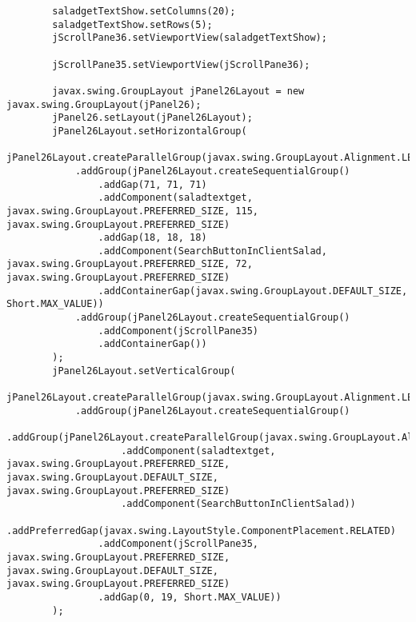 \documentclass[12pt,a4paper]{article}
\begin{document}
\begin{lstlisting}
        saladgetTextShow.setColumns(20);
        saladgetTextShow.setRows(5);
        jScrollPane36.setViewportView(saladgetTextShow);

        jScrollPane35.setViewportView(jScrollPane36);

        javax.swing.GroupLayout jPanel26Layout = new javax.swing.GroupLayout(jPanel26);
        jPanel26.setLayout(jPanel26Layout);
        jPanel26Layout.setHorizontalGroup(
            jPanel26Layout.createParallelGroup(javax.swing.GroupLayout.Alignment.LEADING)
            .addGroup(jPanel26Layout.createSequentialGroup()
                .addGap(71, 71, 71)
                .addComponent(saladtextget, javax.swing.GroupLayout.PREFERRED_SIZE, 115, javax.swing.GroupLayout.PREFERRED_SIZE)
                .addGap(18, 18, 18)
                .addComponent(SearchButtonInClientSalad, javax.swing.GroupLayout.PREFERRED_SIZE, 72, javax.swing.GroupLayout.PREFERRED_SIZE)
                .addContainerGap(javax.swing.GroupLayout.DEFAULT_SIZE, Short.MAX_VALUE))
            .addGroup(jPanel26Layout.createSequentialGroup()
                .addComponent(jScrollPane35)
                .addContainerGap())
        );
        jPanel26Layout.setVerticalGroup(
            jPanel26Layout.createParallelGroup(javax.swing.GroupLayout.Alignment.LEADING)
            .addGroup(jPanel26Layout.createSequentialGroup()
                .addGroup(jPanel26Layout.createParallelGroup(javax.swing.GroupLayout.Alignment.BASELINE)
                    .addComponent(saladtextget, javax.swing.GroupLayout.PREFERRED_SIZE, javax.swing.GroupLayout.DEFAULT_SIZE, javax.swing.GroupLayout.PREFERRED_SIZE)
                    .addComponent(SearchButtonInClientSalad))
                .addPreferredGap(javax.swing.LayoutStyle.ComponentPlacement.RELATED)
                .addComponent(jScrollPane35, javax.swing.GroupLayout.PREFERRED_SIZE, javax.swing.GroupLayout.DEFAULT_SIZE, javax.swing.GroupLayout.PREFERRED_SIZE)
                .addGap(0, 19, Short.MAX_VALUE))
        );


\end{lstlisting}
\end{document}

